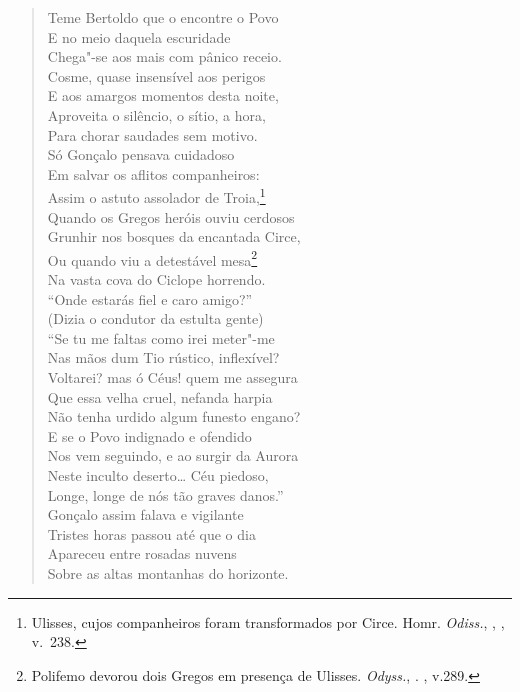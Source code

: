 \begin{verse}
Teme Bertoldo que o encontre o Povo\\ 
E no meio daquela escuridade\\
Chega"-se aos mais com pânico receio.\\
Cosme, quase insensível aos perigos\\
E aos amargos momentos desta noite,\\
Aproveita o silêncio, o sítio, a hora,\\
Para chorar saudades sem motivo.\\
Só Gonçalo pensava cuidadoso\\
Em salvar os aflitos companheiros:\\
Assim o astuto assolador de Troia,\footnote{ Ulisses, cujos companheiros foram transformados por Circe. Homr. \textit{Odiss.}, , , v.~238.}\\ 	\index{\Ulis}
Quando os Gregos heróis ouviu cerdosos\\
Grunhir nos bosques da encantada Circe,\\
Ou quando viu a detestável mesa\footnote{ Polifemo devorou dois Gregos
em presença de Ulisses. \textit{Odyss.}, . , v.289.}\\	\index{\Ulis}
Na vasta cova do Ciclope horrendo.\\
``Onde estarás fiel e caro amigo?''\\
(Dizia o condutor da estulta gente)\\
``Se tu me faltas como irei meter"-me\\
Nas mãos dum Tio rústico, inflexível?\\
Voltarei? mas ó Céus! quem me assegura\\
Que essa velha cruel, nefanda harpia\\
Não tenha urdido algum funesto engano?\\
E se o Povo indignado e ofendido\\
Nos vem seguindo, e ao surgir da Aurora\\
Neste inculto deserto\ldots{}  Céu piedoso,\\
Longe, longe de nós tão graves danos.'' \\[10pt]


Gonçalo assim falava e vigilante\\
Tristes horas passou até que o dia\\
Apareceu entre rosadas nuvens\\
Sobre as altas montanhas do horizonte. \\[10pt]

\end{verse}
\pagebreak

